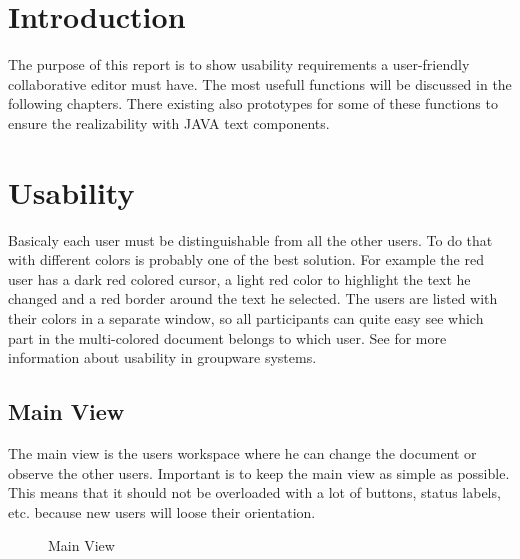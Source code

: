 \documentclass[11pt,a4paper]{article}
\begin{document}
\setlength{\parindent}{0pt}

\newtheorem{defn}{Definition}




\newpage

\tableofcontents
\newpage
\listoftables
\listoffigures
\newpage



\newpage


\section{Introduction}
The purpose of this report is to show usability requirements a user-friendly collaborative editor must have. The most usefull functions will be discussed in the following chapters. There existing also prototypes for some of these functions to ensure the realizability with JAVA text components.

\section{Usability}
Basicaly each user must be distinguishable from all the other users. To do that with different colors is probably one of the best solution. For example the red user has a dark red colored cursor, a light red color to highlight the text he changed and a red border around the text he selected. The users are listed with their colors in a separate window, so all participants can quite easy see which part in the multi-colored document belongs to which user. See \cite{usability} for more information about usability in groupware systems.

\subsection{Main View}
The main view is the users workspace where he can change the document or observe the other users. Important is to keep the main view as simple as possible. This means that it should not be overloaded with a lot of buttons, status labels, etc. because new users will loose their orientation.
\begin{figure}[H]
\centering
{}
\caption{Main View}
\end{figure}
\end{document}
